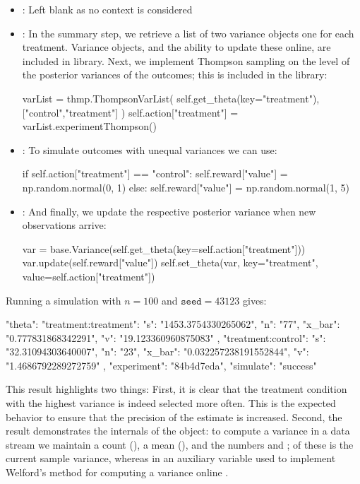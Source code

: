 \documentclass[nojss]{jss}
\begin{document}
\begin{itemize}
\item {}: Left blank as no context is considered
\item {}: In the summary step, we retrieve a list of two variance objects one for each treatment. Variance objects, and the ability to update these online, are included in  library. Next, we implement Thompson sampling on the level of the posterior variances of the outcomes; this is included in the  library:
\begin{Code}
varList = thmp.ThompsonVarList(
    self.get_theta(key="treatment"), ["control","treatment"]
    )
self.action["treatment"] = varList.experimentThompson()
\end{Code}
\item {}: To simulate outcomes with unequal variances we can use:
\begin{Code}
if self.action["treatment"] == "control":
    self.reward["value"] = np.random.normal(0, 1)
else:
    self.reward["value"] = np.random.normal(1, 5)
\end{Code}
\item {}: And finally, we update the respective posterior variance when new observations arrive:
\begin{Code}
var = base.Variance(self.get_theta(key=self.action["treatment"]))
var.update(self.reward["value"])
self.set_theta(var, key="treatment", value=self.action["treatment"])
\end{Code}
\end{itemize}

Running a simulation with $n=100$ and $\texttt{seed}=43123$ gives:

\begin{Code}
{
    "theta": {
        "treatment:treatment": {
            "s": "1453.3754330265062",
            "n": "77",
            "x_bar": "0.777831868342291",
            "v": "19.123360960875083"
        },
        "treatment:control": {
            "s": "32.31094303640007",
            "n": "23",
            "x_bar": "0.032257238191552844",
            "v": "1.4686792289272759"
        }
    },
    "experiment": "84b4d7eda",
    "simulate": "success"
}
\end{Code}
This result highlights two things: First, it is clear that the treatment condition with the highest variance is indeed selected more often. This is the expected behavior to ensure that the precision of the estimate is increased. Second, the result demonstrates the internals of the  object: to compute a variance in a data stream we maintain a count (), a mean (), and the numbers  and ; of these  is the current sample variance, whereas  in an auxiliary variable used to implement Welford's method for computing a variance online \citep{welford1962note}.
\end{document}
